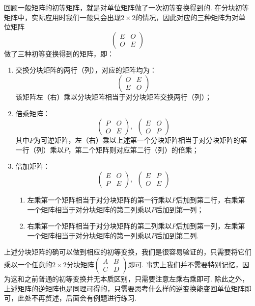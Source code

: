 回顾一般矩阵的初等矩阵，就是对单位矩阵做了一次初等变换得到的. 在分块初等矩阵中，实际应用时我们一般只会出现$2\times 2$的情况，因此对应的三种矩阵为对单位矩阵
\[\begin{pmatrix}
        E & O \\ O & E
    \end{pmatrix}\]做了三种初等变换得到的矩阵，即：
\begin{enumerate}
    \item 交换分块矩阵的两行（列），对应的矩阵均为：
          \[\begin{pmatrix}
                  O & E \\ E & O
              \end{pmatrix}\]
          该矩阵左（右）乘以分块矩阵相当于对分块矩阵交换两行（列）；

    \item 倍乘矩阵：
          \[\begin{pmatrix}
                  P & O \\ O & E
              \end{pmatrix},\enspace\begin{pmatrix}
                  E & O \\ O & P
              \end{pmatrix}\]
          其中$P$为可逆矩阵，左（右）乘以上述第一个分块矩阵相当于对分块矩阵的第一行（列）乘以$P$，第二个矩阵则对应第二行（列）的倍乘；

    \item 倍加矩阵：
          \[\begin{pmatrix}
                  E & O \\ P & E
              \end{pmatrix},\enspace\begin{pmatrix}
                  E & P \\ O & E
              \end{pmatrix}\]
          \begin{enumerate}
              \item 左乘第一个矩阵相当于对分块矩阵的第一行乘以$P$后加到第二行，右乘第一个矩阵相当于对分块矩阵的第二列乘以$P$后加到第一列；

              \item 右乘第一个矩阵相当于对分块矩阵的第二列乘以$P$后加到第一列，左乘第一个矩阵相当于对分块矩阵的第一列乘以$P$后加到第二列.
          \end{enumerate}
\end{enumerate}
上述分块矩阵的确可以做到相应的初等变换，我们是很容易验证的，只需要将它们乘以一个任意的$2\times 2$分块矩阵$\begin{pmatrix}
        A & B \\ C & D
    \end{pmatrix}$即可. 事实上我们并不需要特别记忆，因为这和之前普通的初等变换并无本质区别，只需要注意左乘右乘即可. 除此之外，上述矩阵的逆矩阵也是同理可得的，只需要思考什么样的逆变换能变回单位矩阵即可，此处不再赘述，后面会有例题进行练习.


